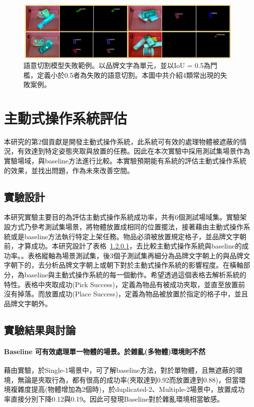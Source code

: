 \begin{figure}[ht]
	\centering
	\includegraphics[height=!, width=1.0\linewidth, keepaspectratio=true]
	{./figures/failure_case.jpg}
  \caption{語意切割模型失敗範例。以品牌文字為單元，並以IoU = 0.5為門檻，定義小於0.5者為失敗的語意切割。本圖中共介紹4類常出現的失敗案例。}
  \label{figure:failure_case}
\end{figure}

\section{主動式操作系統評估}

本研究的第2個貢獻是開發主動式操作系統，此系統可有效的處理物體被遮蔽的情況，有效達到特定姿態夾取與放置的任務。因此在本次實驗中採用測試集場景作為實驗場域，與baseline方法進行比較。本實驗預期能有系統的評估主動式操作系統的效果，並找出問題，作為未來改善空間。

\subsection{實驗設計}
本研究實驗主要目的為評估主動式操作系統成功率，共有6個測試場域集。實驗架設方式乃參考測試集場景，將物體放置成相同的位置擺法，接著藉由主動式操作系統或是baseline方法執行特定上架任務。物品必須被放置規定格子，並品牌文字朝前，才算成功。本研究設計了表格~\ref{}，去比較主動式操作系統與baseline的成功率。。表格縱軸為場景測試集，後3個子測試集再細分為品牌文字朝上的與品牌文字朝下的，去分析品牌文字朝上或朝下對於主動式操作系統的影響程度。在橫軸部分，為baseline與主動式操作系統的每一個動作。希望透過這個表格去解析系統的特性。表格中夾取成功(Pick Success)，定義為物品有被成功夾取，並直至放置前沒有掉落。而放置成功(Place Success)，定義為物品被放置於指定的格子中，並且品牌文字朝外。

\subsection{實驗結果與討論}

\paragraph{Baseline 可有效處理單一物體的場景。於雜亂(多物體)環境則不然}
藉由實驗，於Single-1場景中，可了解baseline方法，對於單物體，且無遮蔽的環境，無論是夾取行為，都有很高的成功率(夾取達到0.92而放置達到0.88)，但當環境複雜度提高(物體增加為2個時)，於duplicated-2、Multiple-2場景中，放置成功率直接分別下降0.12與0.19。因此可發現Baseline對於雜亂環境相當敏感。

